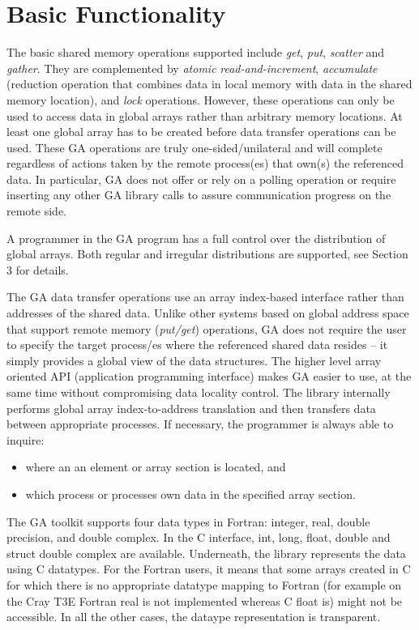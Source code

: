 \section{Basic Functionality}

The basic shared memory operations supported include \emph{get}, \emph{put},
\emph{scatter} and \emph{gather}. They are complemented by \emph{atomic}
\emph{read-and-increment}, \emph{accumulate} (reduction operation that combines
data in local memory with data in the shared memory location), and \emph{lock}
operations. However, these operations can only be used to access data in global
arrays rather than arbitrary memory locations. At least one global array has to
be created before data transfer operations can be used. These GA operations are
truly one-sided/unilateral and will complete regardless of actions taken by the
remote process(es) that own(s) the referenced data. In particular, GA does not
offer or rely on a polling operation or require inserting any other GA library
calls to assure communication progress on the remote side. 

A programmer in the GA program has a full control over the distribution of
global arrays. Both regular and irregular distributions are supported, see
Section 3 for details. 

The GA data transfer operations use an array index-based interface rather than
addresses of the shared data. Unlike other systems based on global address
space that support remote memory (\emph{put/get}) operations, GA does not
require the user to specify the target process/es where the referenced shared
data resides -- it simply provides a global view of the data structures. The
higher level array oriented API (application programming interface) makes GA
easier to use, at the same time without compromising data locality control. The
library internally performs global array index-to-address translation and then
transfers data between appropriate processes. If necessary, the programmer is
always able to inquire: 
\begin{itemize}
\item where an an element or array section is located, and 
\item which process or processes own data in the specified array section. 
\end{itemize}
The GA toolkit supports four data types in Fortran: integer, real, double
precision, and double complex. In the C interface, int, long, float, double and
struct double complex are available. Underneath, the library represents the
data using C datatypes. For the Fortran users, it means that some arrays
created in C for which there is no appropriate datatype mapping to Fortran (for
example on the Cray T3E Fortran real is not implemented whereas C float is)
might not be accessible.  In all the other cases, the dataype representation is
transparent. 

